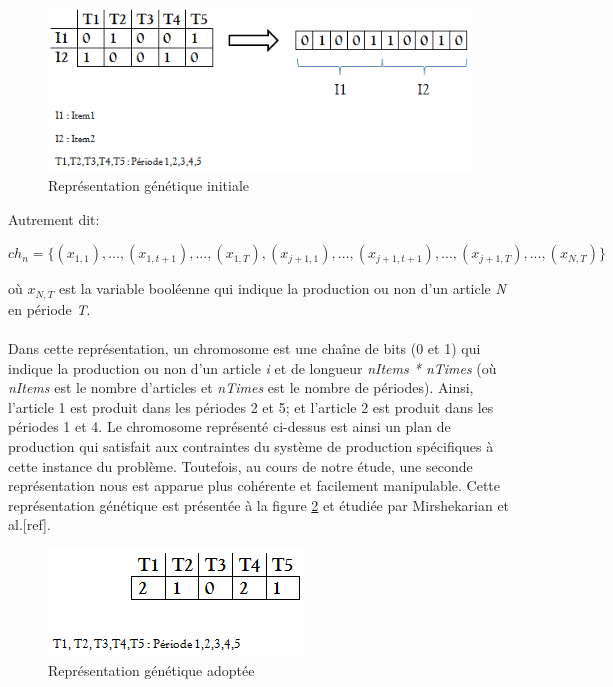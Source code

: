 \documentclass[12pt,a4paper]{article}
\begin{document}
	\begin{figure}[h]
		\begin{center}
			\includegraphics[scale=.5]{img/init_gene_repr.png}
			\caption{Représentation génétique initiale}
			\label{fig:init_gene_repr}
		\end{center}
	\end{figure}
	
	Autrement dit:
	\begin{center}
		$ch_{n} = \{(x_{1,1}),..., (x_{1,t+1}),..., ( x_{1,T}), (x_{j+1,1}),...,(x_{j+1, t+1}),..., (x_{j+1,T}),..., (x_{N,T})\}$ \\
	\end{center}
	\hspace*{.5cm} où $x_{N,T}$ est la variable booléenne qui indique la production ou non d'un article \emph{N} en période \emph{T}.  \\
	\\
	\hspace*{.5cm} Dans cette représentation, un chromosome est une chaîne de bits (0 et 1) qui indique la production ou non d'un article \emph{i} et de longueur \emph{nItems * nTimes} (où \emph{nItems} est le nombre d'articles et \emph{nTimes} est le nombre de périodes). Ainsi, l'article 1 est produit dans les périodes 2 et 5; et l'article 2 est produit dans les périodes 1 et 4. Le chromosome représenté ci-dessus est ainsi un plan de production qui satisfait aux contraintes du système de production spécifiques à cette instance du problème. Toutefois, au cours de notre étude, une seconde représentation nous est apparue plus cohérente et facilement manipulable. Cette représentation génétique est présentée à la figure \ref{fig:adopt_gene_repr} et étudiée par Mirshekarian et al.[ref].
	
	\begin{figure}[!h]
		\begin{center}
			\includegraphics[scale=.5]{img/adopt_gene_repr.png}
			\caption{Représentation génétique adoptée}
			\label{fig:adopt_gene_repr}
		\end{center}
	\end{figure}
	
\end{document}
